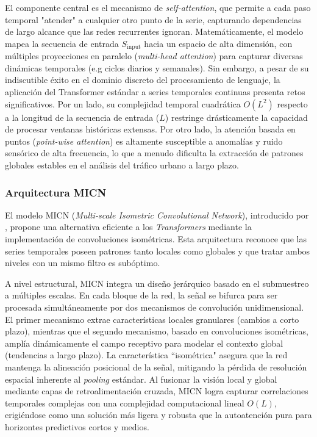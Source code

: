 El componente central es el mecanismo de \textit{self-attention}, que permite a cada paso temporal "atender" a cualquier otro punto de la serie, capturando dependencias de largo alcance que las redes recurrentes ignoran. Matemáticamente, el modelo mapea la secuencia de entrada $S_{\text{input}}$ hacia un espacio de alta dimensión, con múltiples proyecciones en paralelo (\textit{multi-head attention}) para capturar diversas dinámicas temporales (e.g ciclos diarios y semanales). Sin embargo, a pesar de su indiscutible éxito en el dominio discreto del procesamiento de lenguaje, la aplicación del Transformer estándar a series temporales continuas presenta retos significativos. Por un lado, su complejidad temporal cuadrática $O(L^2)$ respecto a la longitud de la secuencia de entrada ($L$) restringe drásticamente la capacidad de procesar ventanas históricas extensas. Por otro lado, la atención basada en puntos (\textit{point-wise attention}) es altamente susceptible a anomalías y ruido sensórico de alta frecuencia, lo que a menudo dificulta la extracción de patrones globales estables en el análisis del tráfico urbano a largo plazo.

\subsubsection{Arquitectura MICN}

El modelo MICN (\textit{Multi-scale Isometric Convolutional Network}), introducido por \textcite{wang2023micn}, propone una alternativa eficiente a los \textit{Transformers} mediante la implementación de convoluciones isométricas. Esta arquitectura reconoce que las series temporales poseen patrones tanto locales como globales y que tratar ambos niveles con un mismo filtro es subóptimo.

A nivel estructural, MICN integra un diseño jerárquico basado en el submuestreo a múltiples escalas. En cada bloque de la red, la señal se bifurca para ser procesada simultáneamente por dos mecanismos de convolución unidimensional. El primer mecanismo extrae características locales granulares (cambios a corto plazo), mientras que el segundo mecanismo, basado en convoluciones isométricas, amplía dinámicamente el campo receptivo para modelar el contexto global (tendencias a largo plazo). La característica ``isométrica" asegura que la red mantenga la alineación posicional de la señal, mitigando la pérdida de resolución espacial inherente al \textit{pooling} estándar. Al fusionar la visión local y global mediante capas de retroalimentación cruzada, MICN logra capturar correlaciones temporales complejas con una complejidad computacional lineal $O(L)$, erigiéndose como una solución más ligera y robusta que la autoatención pura para horizontes predictivos cortos y medios.


